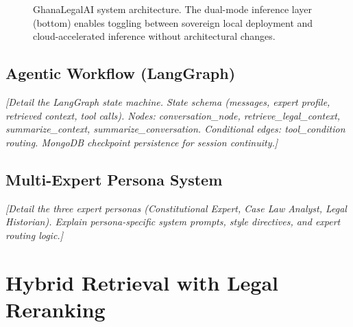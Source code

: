 \documentclass[11pt]{article}
\begin{document}
\begin{figure}[t]
\centering
\caption{GhanaLegalAI system architecture. The dual-mode inference layer
(bottom) enables toggling between sovereign local deployment and
cloud-accelerated inference without architectural changes.}
\label{fig:architecture}
\end{figure}


\subsection{Agentic Workflow (LangGraph)}


\textit{[Detail the LangGraph state machine. State schema
(messages, expert profile, retrieved context, tool calls).
Nodes: conversation\_node, retrieve\_legal\_context, summarize\_context,
summarize\_conversation. Conditional edges: tool\_condition routing.
MongoDB checkpoint persistence for session continuity.]}


\subsection{Multi-Expert Persona System}


\textit{[Detail the three expert personas (Constitutional Expert,
Case Law Analyst, Legal Historian). Explain persona-specific system
prompts, style directives, and expert routing logic.]}


\section{Hybrid Retrieval with Legal Reranking}
\label{sec:retrieval}
\end{document}
